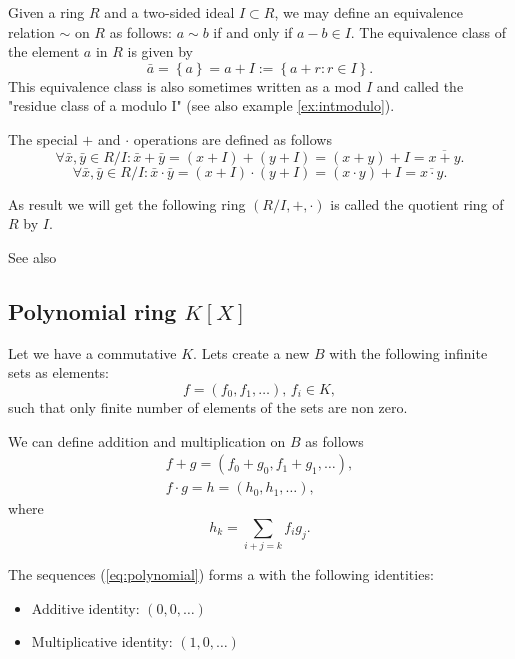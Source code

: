 \begin{appendices}
\begin{definition}
  Given a ring $R$ and a two-sided ideal $I \subset R$, we may define
  an equivalence relation $\sim$ on $R$ as follows: 
  $a \sim b$ if and only if $a - b \in I$.
  The equivalence class of the element $a$ in $R$ is given by
  \[
  \bar{a} = \left\{a\right\} = a + I := \left\{ a + r : r \in I \right\}.
  \]
  This equivalence class is also sometimes written as a mod $I$ and
  called the "residue class of a modulo I" (see also example
  \ref{ex:intmodulo}).

  The special $+$ and $\cdot$ operations are defined as follows
  \[
  \forall \bar{x},\bar{y} \in R/I:
  \bar{x} + \bar{y} = \left(x + I\right) + \left(y + I\right) =
  \left(x+y\right) + I = \overline{x+y}.
  \]
  \[
  \forall \bar{x},\bar{y} \in R/I:
  \bar{x} \cdot \bar{y} = \left(x + I\right) \cdot \left(y + I\right) =
  \left(x \cdot y\right) + I = \overline{x \cdot y}.
  \]

  As result we will get the following ring $\left(R/I, +,
  \cdot\right)$ is called the quotient ring of $R$ by $I$.

  See also 
  \label{def:quotientring}
\end{definition}

\subsection{Polynomial ring $K\left[X\right]$}

Let we have a commutative  $K$. Lets create a new
 $B$ with the following infinite sets as elements:
\begin{equation}
  f = \left(f_0, f_1, \dots \right), \, f_i \in K,
  \label{eq:polynomial}
\end{equation}
such that only finite number of elements of the sets are non zero.

We can define addition and multiplication on $B$ as follows
\begin{eqnarray}
  f + g = \left(f_0 + g_0, f_1 + g_1, \dots \right),
  \nonumber \\
  f \cdot g = h = \left(h_0, h_1, \dots \right),
  \label{eq:polynomialops}
\end{eqnarray}
where
\[
h_k = \sum_{i + j =k} f_i g_j. 
\]

The sequences (\ref{eq:polynomial}) forms a  with
the following identities:
\begin{itemize}
\item Additive identity: $\left(0, 0, \dots \right)$
\item Multiplicative identity: $\left(1, 0, \dots \right)$
\end{itemize}


\end{appendices}
